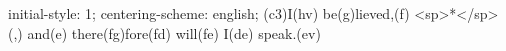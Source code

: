 initial-style: 1;
centering-scheme: english;
(c3)I(hv) be(g)lieved,(f) <sp>*</sp>(,) and(e) there(fg)fore(fd) will(fe) I(de) speak.(ev)
